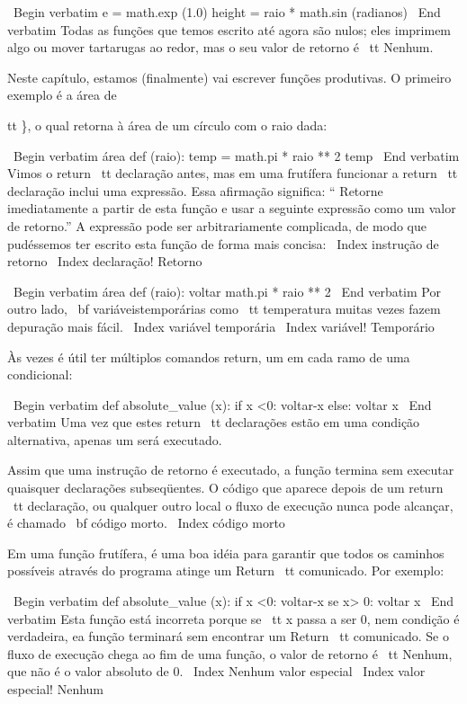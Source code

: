 \documentclass[10pt]{book}
\begin{document}
{{{\ Begin {verbatim}
e = math.exp (1.0)
height = raio * math.sin (radianos)
\ End {verbatim}
%
Todas as funções que temos escrito até agora são nulos; eles imprimem
algo ou mover tartarugas ao redor, mas o seu valor de retorno é {\ tt
Nenhum}.

Neste capítulo, estamos (finalmente) vai escrever funções produtivas.
O primeiro exemplo é a área de {tt \}, o qual retorna à área de um círculo
com o raio dada:

\ Begin {verbatim}
área def (raio):
    temp = math.pi * raio ** 2
    temp
\ End {verbatim}
%
Vimos o {return \ tt} declaração antes, mas em uma frutífera
funcionar a {return \ tt} declaração inclui
uma expressão. Essa afirmação significa: `` Retorne imediatamente a partir de
esta função e usar a seguinte expressão como um valor de retorno.''
A expressão pode ser arbitrariamente complicada, de modo que pudéssemos
ter escrito esta função de forma mais concisa:
\ Index {instrução de retorno}
\ Index {declaração! Retorno}

\ Begin {verbatim}
área def (raio):
    voltar math.pi * raio ** 2
\ End {verbatim}
%
Por outro lado, {\ bf variáveis ​​temporárias} como {\ tt temperatura} muitas vezes fazem
depuração mais fácil.
\ Index {variável temporária}
\ Index {variável! Temporário}

Às vezes é útil ter múltiplos comandos return, um em cada
ramo de uma condicional:

\ Begin {verbatim}
def absolute_value (x):
    if x <0:
        voltar-x
    else:
        voltar x
\ End {verbatim}
%
Uma vez que estes {return \ tt} declarações estão em uma condição alternativa,
apenas um será executado.

Assim que uma instrução de retorno é executado, a função
termina sem executar quaisquer declarações subseqüentes.
O código que aparece depois de um {return \ tt} declaração, ou qualquer outro local
o fluxo de execução nunca pode alcançar, é chamado {\ bf código morto}.
\ Index {código morto}

Em uma função frutífera, é uma boa idéia para garantir
que todos os caminhos possíveis através do programa atinge um
{Return \ tt} comunicado. Por exemplo:

\ Begin {verbatim}
def absolute_value (x):
    if x <0:
        voltar-x
    se x> 0:
        voltar x
\ End {verbatim}
%
Esta função está incorreta porque se {\ tt x} passa a ser 0,
nem condição é verdadeira, ea função terminará sem encontrar um
{Return \ tt} comunicado. Se o fluxo de execução chega ao fim
de uma função, o valor de retorno é {\ tt Nenhum}, que não é
o valor absoluto de 0.
\ Index {Nenhum valor especial}
\ Index {valor especial! Nenhum}

}}}}
\end{document}
